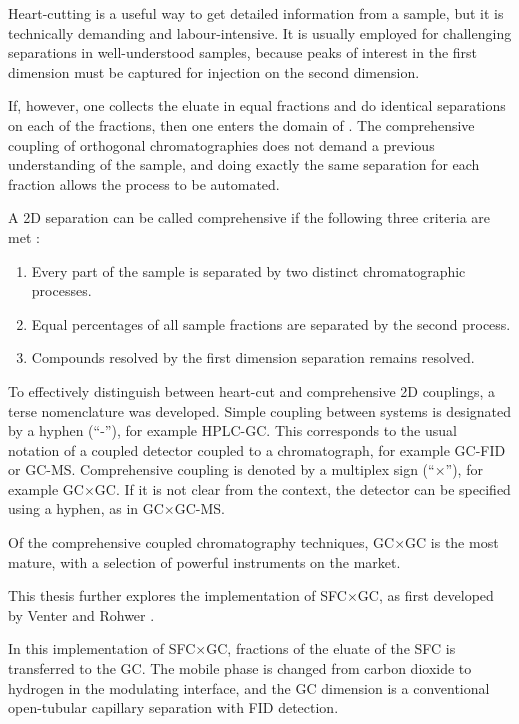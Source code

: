 Heart-cutting is a useful way to get detailed information from a sample, but it
is technically demanding and labour-intensive. It is usually employed for
challenging separations in well-understood samples, because peaks of interest
in the first dimension must be captured for injection on the second dimension.

If, however, one collects the eluate in equal fractions and do identical
separations on each of the fractions, then one enters the domain of
. The comprehensive coupling of
orthogonal chromatographies does not demand a previous understanding of the
sample, and doing exactly the same separation for each fraction allows the
process to be automated.

A 2D separation can be called comprehensive if the following three criteria are
met \autocite{Giddings1987}:

\begin{enumerate}
  \item Every part of the sample is separated by two distinct chromatographic processes.
  \item Equal percentages of all sample fractions are separated by the second process.	 
  \item Compounds resolved by the first dimension separation remains resolved.  
\end{enumerate} 

To effectively distinguish between heart-cut and comprehensive 2D couplings, a
terse nomenclature was developed. Simple coupling between systems is
designated by a hyphen (``-''), for example HPLC-GC. This corresponds to the
usual notation of a coupled detector coupled to a chromatograph, for example
GC-FID or GC-MS. Comprehensive coupling is denoted by a multiplex sign
(``$\times$''), for example GC$\times$GC. If it is not clear from the context,
the detector can be specified using a hyphen, as in GC$\times$GC-MS.

Of the comprehensive coupled chromatography techniques, GC$\times$GC is the most
mature, with a selection of powerful instruments on the market.

This thesis further explores the implementation of SFC$\times$GC, as first
developed by Venter and Rohwer \autocite{Venter2004, Venter2006}.

In this implementation of SFC$\times$GC, fractions of the eluate of the SFC is
transferred to the GC. The mobile phase is changed from carbon dioxide to
hydrogen in the modulating interface, and the GC dimension is a conventional open-tubular
capillary separation with FID detection.

